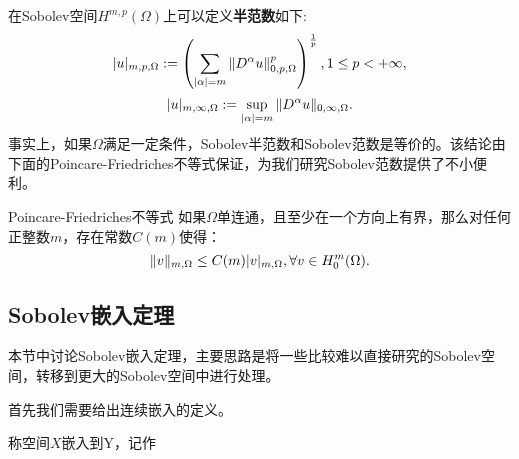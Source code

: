 在Sobolev空间$H^{m,p}(\Omega)$上可以定义\textbf{半范数}如下:
\begin{equation}
    |u|_{m,p,\Omega}:=\left(\sum_{|\alpha|=m}\|D^{\alpha}u\|_{0,p,\Omega}^{p}\right)^{\frac{1}{p}},1\le p<+\infty,
\end{equation}
\begin{equation}
    |u|_{m,\infty,\Omega}:=\sup_{|\alpha|=m}\|D^{\alpha}u\|_{0,\infty,\Omega}.
\end{equation}
事实上，如果$\Omega$满足一定条件，Sobolev半范数和Sobolev范数是等价的。该结论由下面的Poincare-Friedriches不等式保证，为我们研究Sobolev范数提供了不小便利。
\begin{theorem}{Poincare-Friedriches不等式}
    如果$\Omega$单连通，且至少在一个方向上有界，那么对任何正整数$m$，存在常数$C(m)$使得：
    \begin{equation}
        \|v\|_{m,\Omega}\le C(m)|v|_{m,\Omega},\forall v\in H_{0}^{m}(\Omega).
    \end{equation}
\end{theorem}
\subsection{Sobolev嵌入定理}
本节中讨论Sobolev嵌入定理，主要思路是将一些比较难以直接研究的Sobolev空间，转移到更大的Sobolev空间中进行处理。

首先我们需要给出连续嵌入的定义。
\begin{definition}
    称空间$X$嵌入到Y，记作
\end{definition}